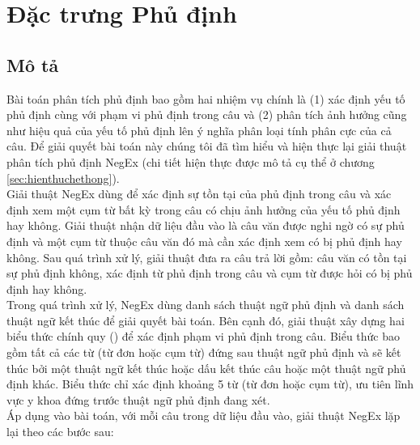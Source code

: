 \section{Đặc trưng Phủ định} \label{sec:su-phu-dinh} \label{subsec:negation}
\subsection*{Mô tả}
Bài toán phân tích phủ định bao gồm hai nhiệm vụ chính là (1) xác định yếu tố phủ định cùng với phạm vi phủ định trong câu và (2) phân tích ảnh hưởng cũng như hiệu quả của yếu tố phủ định lên ý nghĩa phân loại tính phân cực của cả câu. Để giải quyết bài toán này chúng tôi đã tìm hiểu và hiện thực lại giải thuật phân tích phủ định NegEx\cite{Tanushi2013} (chi tiết hiện thực được mô tả cụ thể ở chương \ref{sec:hienthuchethong}).\\

Giải thuật NegEx dùng để xác định sự tồn tại của phủ định trong câu và xác định xem một cụm từ bất kỳ trong câu có chịu ảnh hưởng của yếu tố phủ định hay không. Giải thuật nhận dữ liệu đầu vào là câu văn được nghi ngờ có sự phủ định và một cụm từ thuộc câu văn đó mà cần xác định xem có bị phủ định hay không. Sau quá trình xử lý, giải thuật đưa ra câu trả lời gồm: câu văn có tồn tại sự phủ định không, xác định từ phủ định trong câu và cụm từ được hỏi có bị phủ định hay không.\\ 

Trong quá trình xử lý, NegEx dùng danh sách thuật ngữ phủ định và danh sách thuật ngữ kết thúc để giải quyết bài toán. Bên cạnh đó, giải thuật xây dựng hai biểu thức chính quy  () để xác định phạm vi phủ định trong câu. Biểu thức  bao gồm tất cả các từ (từ đơn hoặc cụm từ) đứng sau thuật ngữ phủ định và sẽ kết thúc bởi một thuật ngữ kết thúc hoặc dấu kết thúc câu hoặc một thuật ngữ phủ định khác. Biểu thức  chỉ xác định khoảng 5 từ (từ đơn hoặc cụm từ), ưu tiên lĩnh vực y khoa đứng trước thuật ngữ phủ định đang xét. \\

Áp dụng vào bài toán, với mỗi câu trong dữ liệu đầu vào, giải thuật NegEx lặp lại theo các bước sau:

